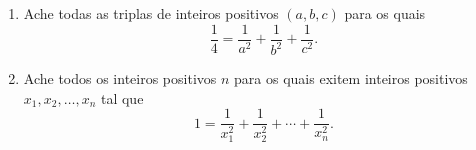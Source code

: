 \begin{enumerate}[label = (\alph*)]
	\item Ache todas as triplas de inteiros positivos $(a, b, c)$ para os quais \[\frac{1}{4} = \frac{1}{a^2} + \frac{1}{b^2} + \frac{1}{c^2}.\]
	\item Ache todos os inteiros positivos $n$ para os quais exitem inteiros positivos $x_1, x_2, \dots, x_n$ tal que \[ 1 = \frac{1}{x_1^2} + \frac{1}{x_2^2} + \cdots + \frac{1}{x_n^2}. \]
\end{enumerate}
